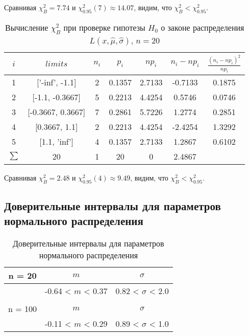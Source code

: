 \documentclass[../main.tex]{subfiles}
\begin{document}
    \noindent Сравнивая $\chi^{2}_{B} = 7.74$ и $\chi^{2}_{0.95}(7) \approx 14.07$, видим, что $\chi^{2}_{B} < \chi^{2}_{0.95}$.
    \\
    
    \begin{table}[H]
    	\centering
    	\begin{tabular}{| c | c | c | c | c | c | c |}
    		\hline
    		$i$ & $limits$         &   $n_i$ &    $p_i$ &   $np_i$ &   $n_i - np_i$ &   $\frac{(n_i-np_i)^2}{np_i}$ \\
    		\hline
                 1 & ['-inf', -1.1]    &  2 & 0.1357 &  2.7133 & -0.7133 & 0.1875 \\
                 2 & [-1.1, -0.3667]   &  5 & 0.2213 &  4.4254 &  0.5746 & 0.0746 \\
                 3 & [-0.3667, 0.3667] &  7 & 0.2861 &  5.7226 &  1.2774 & 0.2851 \\
                 4 & [0.3667, 1.1]     &  2 & 0.2213 &  4.4254 & -2.4254 & 1.3292 \\
                 5 & [1.1, 'inf']      &  4 & 0.1357 &  2.7133 &  1.2867 & 0.6102 \\
                 $\sum$                & 20 & 1      & 20      &  0      & 2.4867 \\
    		\hline
    	\end{tabular}
    	\caption{ Вычисление $\chi^{2}_{B}$ при проверке гипотезы $H_{0}$ о законе распределения $L(x,\hat{\mu}, \hat{\sigma})$, $n=20$}
    	\label{tab:laplace_chi_2}
    \end{table}
    
    \noindent Сравнивая $\chi^{2}_{B} = 2.48$ и $\chi^{2}_{0.95}(4) \approx 9.49$, видим, что $\chi^{2}_{B} < \chi^{2}_{0.95}$.
    \\
    
    \subsection{Доверительные интервалы для параметров нормального распределения}
	\begin{table}[H]
	    \centering
	    \begin{tabular}{| c | c | c |}
	    \hline
	       n = 20   &  $m$  & $\sigma$\\ \hline
	          &  -0.64 < $m$ < 0.37 & 0.82 < $\sigma$ < 2.0 \\ \hline
	         &   &   \\ \hline
	       n = 100   &  $m$  & $\sigma$\\ \hline
	        & -0.11 < $m$ < 0.29 & 0.89 < $\sigma$ < 1.0 \\
	   \hline
	    \end{tabular}
	    \caption{Доверительные интервалы для параметров нормального распределения}
	    \label{tab:interv_simple}
	\end{table}
	
\end{document}
